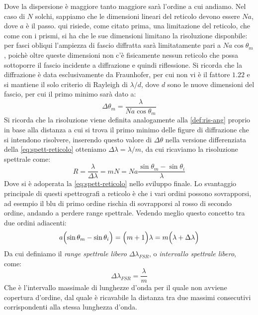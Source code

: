 \noindent
Dove la dispersione è maggiore tanto maggiore sarà l'ordine a cui andiamo. Nel caso di $N$ solchi, sappiamo che le dimensioni lineari del reticolo devono essere $Na$, dove $a$ è il passo. qui risiede, come citato prima, una limitazione del reticolo, che come con i prismi, si ha che le sue dimensioni limitano la risoluzione disponbile: per fasci obliqui l'ampiezza di fascio diffratta sarà limitatamente pari a $Na\cos\theta_m$, poichè oltre queste dimensioni non c'è fisicamente nessun reticolo che possa sottoporre il fascio incidente a diffrazione e quindi riflessione. Si ricorda che la diffrazione è data esclusivamente da Fraunhofer, per cui non vi è il fattore $1.22$ e si mantiene il solo criterio di Rayleigh di $\lambda/d$, dove $d$ sono le nuove dimensioni del fascio, per cui il primo minimo sarà dato a:
\begin{equation*}
    \Delta\theta_m=\frac{\lambda}{Na\cos\theta_m}
\end{equation*}
Si ricorda che la risoluzione viene definita analogamente alla \ref{def:ris-ang} proprio in base alla distanza a cui si trova il primo minimo delle figure di diffrazione che si intendono risolvere, inserendo questo valore di $\Delta\theta$ nella versione differenziata della \ref{eq:spett-reticolo} otteniamo $\Delta\lambda=\lambda/m$, da cui ricaviamo la risoluzione spettrale come:
\begin{equation}
    \label{eq:spett-ris-spet-reticolo}
    R = \frac{\lambda}{\Delta\lambda} =
    mN =
    Na \frac{\sin\theta_m-\sin\theta_i}{\lambda}
\end{equation}
Dove si è adoperata la \ref{eq:spett-reticolo} nello sviluppo finale. Lo svantaggio principale di questi spettrografi a reticolo è che i vari ordini possono sovrapporsi, ad esempio il blu di primo ordine rischia di sovrapporsi al rosso di secondo ordine, andando a perdere range spettrale. Vedendo meglio questo concetto tra due ordini adiacenti:
\begin{equation*}
    a \Bigl( \sin\theta_m - \sin\theta_i \Bigr) =
    \Bigl( m+1 \Bigr) \lambda =
    m \Bigl( \lambda + \Delta\lambda \Bigr)
\end{equation*}
Da cui definiamo il \textit{range spettrale libero} $\Delta\lambda_{FSR}$, o \textit{intervallo spettrale libero}, come:
\begin{equation}
    \label{eq:spett-FSR}
    \Delta\lambda_{FSR} = \frac{\lambda}{m}
\end{equation}
Che è l'intervallo massimale di lunghezze d'onda per il quale non avviene copertura d'ordine, dal quale è ricavabile la distanza tra due massimi consecutivi corrispondenti alla stessa lunghezza d'onda.

